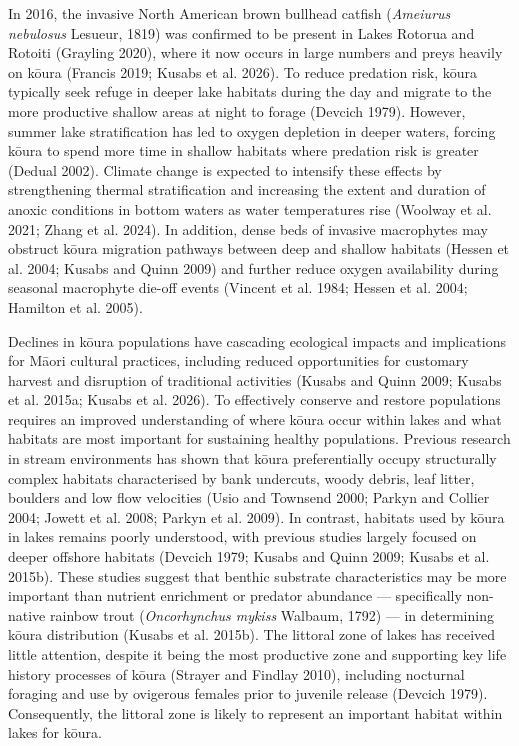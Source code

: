 \documentclass[
  12pt,
  a4paper,
  oneside]{scrbook}
\begin{document}
In 2016, the invasive North American brown bullhead catfish
(\emph{Ameiurus nebulosus} Lesueur, 1819) was confirmed to be present in
Lakes Rotorua and Rotoiti (Grayling 2020), where it now occurs in large
numbers and preys heavily on kōura (Francis 2019; Kusabs et al. 2026).
To reduce predation risk, kōura typically seek refuge in deeper lake
habitats during the day and migrate to the more productive shallow areas
at night to forage (Devcich 1979). However, summer lake stratification
has led to oxygen depletion in deeper waters, forcing kōura to spend
more time in shallow habitats where predation risk is greater (Dedual
2002). Climate change is expected to intensify these effects by
strengthening thermal stratification and increasing the extent and
duration of anoxic conditions in bottom waters as water temperatures
rise (Woolway et al. 2021; Zhang et al. 2024). In addition, dense beds
of invasive macrophytes may obstruct kōura migration pathways between
deep and shallow habitats (Hessen et al. 2004; Kusabs and Quinn 2009)
and further reduce oxygen availability during seasonal macrophyte
die-off events (Vincent et al. 1984; Hessen et al. 2004; Hamilton et al.
2005).

Declines in kōura populations have cascading ecological impacts and
implications for Māori cultural practices, including reduced
opportunities for customary harvest and disruption of traditional
activities (Kusabs and Quinn 2009; Kusabs et al. 2015a; Kusabs et al.
2026). To effectively conserve and restore populations requires an
improved understanding of where kōura occur within lakes and what
habitats are most important for sustaining healthy populations. Previous
research in stream environments has shown that kōura preferentially
occupy structurally complex habitats characterised by bank undercuts,
woody debris, leaf litter, boulders and low flow velocities (Usio and
Townsend 2000; Parkyn and Collier 2004; Jowett et al. 2008; Parkyn et
al. 2009). In contrast, habitats used by kōura in lakes remains poorly
understood, with previous studies largely focused on deeper offshore
habitats (Devcich 1979; Kusabs and Quinn 2009; Kusabs et al. 2015b).
These studies suggest that benthic substrate characteristics may be more
important than nutrient enrichment or predator abundance ---
specifically non-native rainbow trout (\emph{Oncorhynchus mykiss}
Walbaum, 1792) --- in determining kōura distribution (Kusabs et al.
2015b). The littoral zone of lakes has received little attention,
despite it being the most productive zone and supporting key life
history processes of kōura (Strayer and Findlay 2010), including
nocturnal foraging and use by ovigerous females prior to juvenile
release (Devcich 1979). Consequently, the littoral zone is likely to
represent an important habitat within lakes for kōura.
\end{document}
